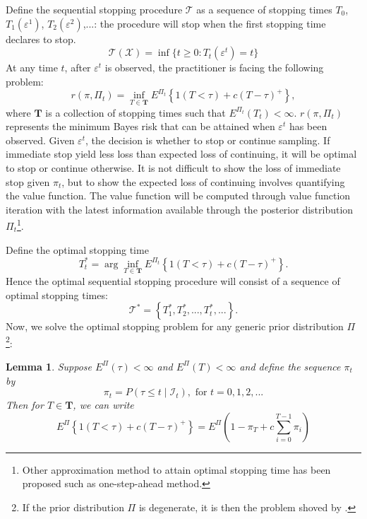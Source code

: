 \documentclass[preprint,authoryear,12pt,english]{elsarticle}
\theoremstyle{plain}
\newtheorem{lemma}{Lemma}[section]
\begin{document}
Define the sequential stopping procedure $\mathcal{T}$ as a sequence of stopping times $T_{0}$, $T_{1}(\varepsilon^{1})$, $T_{2}(\varepsilon^{2})$,...: the procedure will stop when the first stopping time declares to stop.
\begin{equation}
    \mathcal{T}(\mathcal{X}) = \inf \{ t \geq 0:T_{t}(\varepsilon^{t})=t\}
\end{equation}
At any time $t$, after $\varepsilon^{t}$ is observed, the practitioner is facing the following problem:
\begin{equation}
    r(\pi,\Pi_{t}) = \inf_{T\in \mathbf{T} } E^{\Pi_{t}} \left\{ 1\left(T< \tau \right)+c\left(T-\tau \right)^{+}\right\},
\end{equation}
where $\mathbf{T}$ is a collection of stopping times such that $E^{\Pi_{t}}(T_{t})<\infty$. $r(\pi,\Pi_{t})$ represents the minimum Bayes risk that can be attained when $\varepsilon^{t}$ has been observed. Given $\varepsilon^{t}$, the decision is whether to stop or continue sampling. If immediate stop yield less loss than expected loss of continuing, it will be optimal to stop or continue otherwise. It is not difficult to show the loss of immediate stop given $\pi_{t}$, but to show the expected loss of continuing involves quantifying the value function. The value function will be computed through value function iteration with the latest information available through the posterior distribution $\Pi_{t}$\footnote{Other approximation method to attain optimal stopping time has been proposed such as one-step-ahead method.}.

Define the optimal stopping time
\begin{equation}
    T_{t}^{*} = \arg \inf_{T\in \mathbf{T} } E^{\Pi_{t}} \left\{ 1\left(T< \tau \right)+c\left(T-\tau \right)^{+}\right\}.
\end{equation}
Hence the optimal sequential stopping procedure will consist of a sequence of optimal stopping times:
\begin{equation}
    \mathcal{T}^{*} = \left\{ T_{1}^{*},T_{2}^{*},...,T_{t}^{*},...\right\}.
\end{equation}
Now, we solve the optimal stopping problem for any generic prior distribution $\Pi$\footnote{If the prior distribution $\Pi$ is degenerate, it is then the problem shoved by \cite{Shiryaev1963}.}:
\begin{lemma}
    \label{trans_obj}
    Suppose $E^{\Pi}(\tau) < \infty$ and $E^{\Pi}(T) < \infty$ and define the sequence $\pi_{t}$ by
    \begin{equation}
        \pi_{t} = P(\tau \leq t \mid \mathcal{I}_{t}), \text{ for } t = 0,1,2,...
    \end{equation}
    Then for $T \in \mathbf{T}$, we can write
    \begin{equation}
        E^{\Pi} \left\{ 1\left(T< \tau \right)+c\left(T-\tau \right)^{+}\right\}= E^{\Pi}(1-\pi_{T}+c\sum_{i=0}^{T-1}\pi_{i})
    \end{equation}
\end{lemma}
\end{document}
